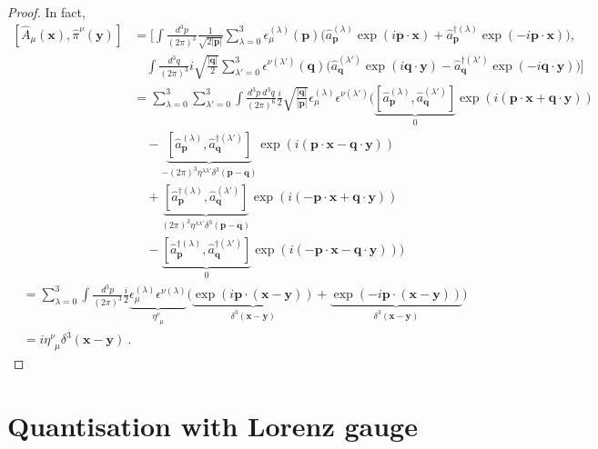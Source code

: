     \begin{proof}
        In fact, 
        \begin{equation*}
        \begin{aligned}
            [\hat A_\mu (\mathbf x), \hat \pi^\nu (\mathbf y)] & = [\int \frac{d^3 p}{(2\pi)^3} \frac{1}{\sqrt{2 |\mathbf p|}} \sum_{\lambda=0}^{3} \epsilon_\mu^{(\lambda)} (\mathbf p) \Big ( \hat a_{\mathbf p}^{(\lambda)} \exp(i \mathbf p \cdot \mathbf x) + \hat a_{\mathbf p}^{\dagger (\lambda)} \exp(- i \mathbf p \cdot \mathbf x) \Big), \\ & \quad \int \frac{d^3 q}{(2\pi)^3} i \sqrt{\frac{|\mathbf q|}{2}} \sum_{\lambda'=0}^{3} \epsilon^{\nu(\lambda')} (\mathbf q) \Big ( \hat a_{\mathbf q}^{(\lambda')}  \exp(i \mathbf q \cdot \mathbf y) - \hat a_{\mathbf q}^{\dagger (\lambda')} \exp(- i \mathbf q \cdot \mathbf y) \Big)] \\ & = \sum_{\lambda=0}^{3} \sum_{\lambda'=0}^{3} \int \frac{d^3 p ~ d^3 q}{(2\pi)^6} \frac{i}{2} \sqrt{\frac{|\mathbf q|}{|\mathbf p|}} \epsilon_\mu^{(\lambda)} \epsilon^{\nu(\lambda')} \Big ( \underbrace{[\hat a_{\mathbf p}^{(\lambda)} , \hat a_{\mathbf q}^{(\lambda')}]}_0 \exp(i (\mathbf p \cdot \mathbf x + \mathbf q \cdot \mathbf y)) \\ & \quad - \underbrace{[\hat a_{\mathbf p}^{(\lambda)} , \hat a_{\mathbf q}^{\dagger (\lambda')}]}_{- (2\pi)^3 \eta^{\lambda \lambda'} \delta^3 (\mathbf p - \mathbf q)} \exp(i (\mathbf p \cdot \mathbf x - \mathbf q \cdot \mathbf y)) \\ & \quad + \underbrace{[\hat a_{\mathbf p}^{\dagger (\lambda)} , \hat a_{\mathbf q}^{(\lambda')}]}_{(2\pi)^3 \eta^{\lambda \lambda'} \delta^3 (\mathbf p - \mathbf q)} \exp(i (- \mathbf p \cdot \mathbf x + \mathbf q \cdot \mathbf y)) \\ & \quad - \underbrace{[\hat a_{\mathbf p}^{\dagger(\lambda)} , \hat a_{\mathbf q}^{\dagger(\lambda')}]}_0 \exp(i (- \mathbf p \cdot \mathbf x - \mathbf q \cdot \mathbf y)) \Big)
        \end{aligned}
        \end{equation*}
        \begin{equation*}
        \begin{aligned}
            & = \sum_{\lambda=0}^{3} \int \frac{d^3 p}{(2\pi)^3} \frac{i}{2} \underbrace{\epsilon_\mu^{(\lambda)} \epsilon^{\nu(\lambda)}}_{\eta^\nu_{\phantom \nu \mu}} \Big ( \underbrace{\exp(i \mathbf p \cdot (\mathbf x - \mathbf y))}_{\delta^3 (\mathbf x - \mathbf y)} + \underbrace{\exp(- i \mathbf p \cdot (\mathbf x - \mathbf y))}_{\delta^3 (\mathbf x - \mathbf y)} \Big) \\ & = i \eta^\nu_{\phantom \nu \mu} \delta^3 (\mathbf x - \mathbf y) ~.
        \end{aligned}
        \end{equation*}
    \end{proof}

\section{Quantisation with Lorenz gauge}